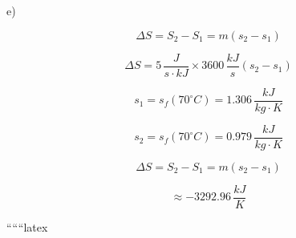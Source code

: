 e)

\[
\Delta S = S_2 - S_1 = m (s_2 - s_1)
\]

\[
\Delta S = 5 \, \frac{J}{s \cdot kJ} \times 3600 \, \frac{kJ}{s} (s_2 - s_1)
\]

\[
s_1 = s_f (70^\circ C) = 1.306 \, \frac{kJ}{kg \cdot K}
\]

\[
s_2 = s_f (70^\circ C) = 0.979 \, \frac{kJ}{kg \cdot K}
\]

\[
\Delta S = S_2 - S_1 = m (s_2 - s_1)
\]

\[
\approx -3292.96 \, \frac{kJ}{K}
\]

``````latex